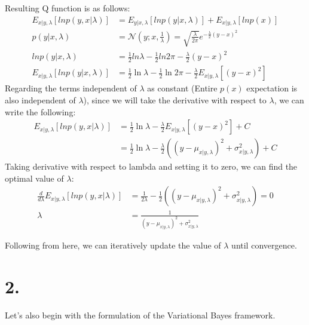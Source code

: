 \documentclass{article}
\begin{document}
Resulting Q function is as follows:
\[
\begin{aligned}
    E_{x|y,\lambda}\left[ ln p(y,x|\lambda)\right] &= E_{y|x,\lambda}\left[ ln p(y|x,\lambda)\right] + E_{x|y,\lambda}\left[ ln p(x)\right] \\
    p(y|x,\lambda) &= \mathcal{N}(y;x,\frac{1}{\lambda}) = \sqrt{\frac{\lambda}{2\pi}} e^{-\frac{\lambda}{2}(y-x)^2} \\
    ln p(y|x,\lambda) &= \frac{1}{2} ln \lambda - \frac{1}{2} ln 2\pi - \frac{\lambda}{2}(y-x)^2 \\
    E_{x|y,\lambda}\left[ ln p(y|x,\lambda)\right] &= \frac{1}{2} \ln \lambda - \frac{1}{2} \ln 2\pi - \frac{\lambda}{2} E_{x|y,\lambda}\left[ (y-x)^2 \right]
\end{aligned}
\]
Regarding the terms independent of $\lambda$ as constant (Entire $p(x)$ expectation is also independent of $\lambda$), since we will take the derivative with respect to $\lambda$, we can write the following:
\[
\begin{aligned}
    E_{x|y,\lambda}\left[ ln p(y,x|\lambda)\right] &= \frac{1}{2} \ln \lambda - \frac{\lambda}{2} E_{x|y,\lambda}\left[ (y-x)^2 \right] + C \\
                                                   &= \frac{1}{2} \ln \lambda - \frac{\lambda}{2} \left( (y-\mu_{x|y,\lambda})^2 + \sigma_{x|y,\lambda}^2 \right) + C
\end{aligned}
\]
Taking derivative with respect to lambda and setting it to zero, we can find the optimal value of $\lambda$:
\[
\begin{aligned}
    \frac{d}{d\lambda} E_{x|y,\lambda}\left[ ln p(y,x|\lambda)\right] &= \frac{1}{2\lambda} - \frac{1}{2} \left( (y-\mu_{x|y,\lambda})^2 + \sigma_{x|y,\lambda}^2 \right) = 0 \\
    \lambda &= \frac{1}{(y-\mu_{x|y,\lambda})^2 + \sigma_{x|y,\lambda}^2} 
\end{aligned}
\]

Following from here, we can iteratively update the value of $\lambda$ until convergence.
\section*{2.}

Let's also begin with the formulation of the Variational Bayes framework. 
\end{document}
